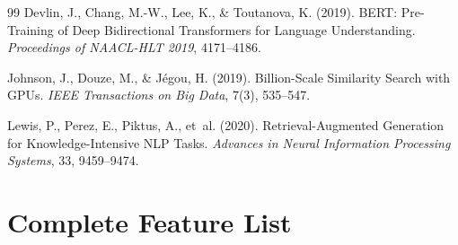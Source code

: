 \documentclass[12pt,a4paper]{article}
\begin{document}
\begin{thebibliography}{99}
Devlin, J., Chang, M.-W., Lee, K., \& Toutanova, K. (2019).
\newblock BERT: Pre-Training of Deep Bidirectional Transformers for Language Understanding.
\newblock \emph{Proceedings of NAACL-HLT 2019}, 4171--4186.

Johnson, J., Douze, M., \& J\'{e}gou, H. (2019).
\newblock Billion-Scale Similarity Search with GPUs.
\newblock \emph{IEEE Transactions on Big Data}, 7(3), 535--547.

Lewis, P., Perez, E., Piktus, A., et~al. (2020).
\newblock Retrieval-Augmented Generation for Knowledge-Intensive NLP Tasks.
\newblock \emph{Advances in Neural Information Processing Systems}, 33, 9459--9474.

\end{thebibliography}

\appendix
\section{Complete Feature List}
\label{app:features}
\end{document}
